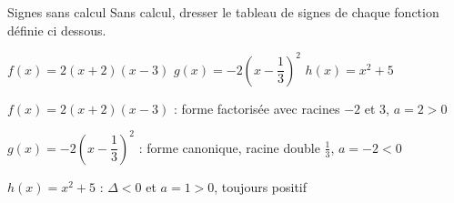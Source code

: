 

\def\rdifficulty{1.5}
\begin{EXO}{Signes sans calcul}{}
Sans calcul, dresser le tableau de signes de chaque fonction définie ci dessous.
\begin{tcbenumerate}[3]
\tcbitem {} $f(x)=2(x+2)(x-3)$
\tcbitem {} $g(x)=-2\left(x-\dfrac{1}{3}\right)^2$
\tcbitem {} $h(x)=x^2+5$\\
\end{tcbenumerate}

\exocorrection

\begin{tcbenumerate}[1]
\tcbitem $f(x)=2(x+2)(x-3)$ : forme factorisée avec racines $-2$ et $3$, $a=2>0$


\tcbitem $g(x)=-2\left(x-\dfrac{1}{3}\right)^2$ : forme canonique, racine double $\frac{1}{3}$, $a=-2<0$


\tcbitem $h(x)=x^2+5$ : $\Delta < 0$ et $a=1>0$, toujours positif

\end{tcbenumerate}
\end{EXO}

